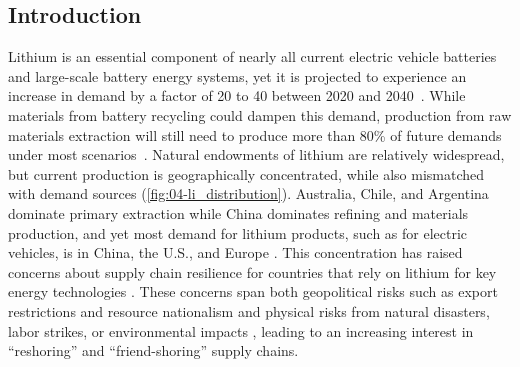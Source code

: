\clearpage
\subsection{Introduction}

Lithium is an essential component of nearly all current electric vehicle batteries and large-scale battery energy systems, yet it is projected to experience an increase in demand by a factor of 20 to 40 between 2020 and 2040~\cite{internationalenergyagencyGlobalCriticalMinerals2024, xuFutureMaterialDemand2020, greimAssessmentLithiumCriticality2020}. While materials from battery recycling could dampen this demand, production from raw materials extraction will still need to produce more than 80\% of future demands under most scenarios~\cite{xuFutureMaterialDemand2020}. Natural endowments of lithium are relatively widespread, but current production is geographically concentrated, while also mismatched with demand sources (\ref{fig:04-li_distribution}). Australia, Chile, and Argentina dominate primary extraction while China dominates refining and materials production, and yet most demand for lithium products, such as for electric vehicles, is in China, the U.S., and Europe \cite{chengElectricVehicleBattery2024, greitemeierChinasHoldLithiumion2025}. This concentration has raised concerns about supply chain resilience for countries that rely on lithium for key energy technologies \cite{internationalenergyagencyGlobalCriticalMinerals2024, olivettiLithiumIonBatterySupply2017, chengElectricVehicleBattery2024}. These concerns span both geopolitical risks such as export restrictions and resource nationalism \cite{bremmerRiseFallResource2009, prinaceraiGeographyControlDeep2024} and physical risks from natural disasters, labor strikes, or environmental impacts \cite{helbigSupplyRisksAssociated2018, schrijversReviewMethodsData2020}, leading to an increasing interest in ``reshoring'' and ``friend-shoring'' supply chains. 


